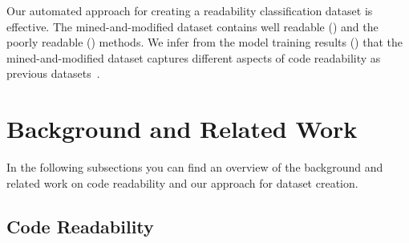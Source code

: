\documentclass[%
class=scrreprt,
chapterprefix=false,%
open=right,%
twoside=false,%
paper=a4,%
logofile={Logo\_zentral\_farbig\_EN.png},%
thesistype=master,%
UKenglish,%
]{se2thesis}
\theoremstyle{definition}
\newcommand{\citeolddataset}{\cite{buse2009learning, dorn2012general, scalabrino2018comprehensive}\xspace}
\begin{document}

	Our automated approach for creating a readability classification dataset is effective. The mined-and-modified dataset contains well readable () and the poorly readable () methods.
	We infer from the model training results () that the mined-and-modified dataset captures different aspects of code readability as previous datasets~\citeolddataset.
		
\section{Background and Related Work} \label{Background and Related Work}
	In the following subsections you can find an overview of the background and related work on code readability and our approach for dataset creation.
	
\subsection{Code Readability} \label{Code Readability}
		
	
	
\end{document}
